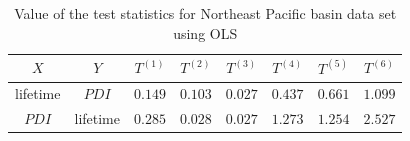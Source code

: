 \begin{table}[H]
	\centering
	\begin{tabular}{cccccccc}
	\toprule
	\toprule
	$X$   & $Y$   & $T^{(1)}$ & $T^{(2)}$ & $T^{(3)}$ & $T^{(4)}$ & $T^{(5)}$ & $T^{(6)}$ \\
	\midrule
	lifetime & $PDI$ & $0.149$ & $0.103$ & $0.027$ & $0.437$ & $0.661$ & $1.099$ \\
	$PDI$ & lifetime & $0.285$ & $0.028$ & $0.027$ & $1.273$ & $1.254$ & $2.527$ \\
	\bottomrule
	\end{tabular}
	\caption{Value of the test statistics for Northeast Pacific basin data set using OLS}
	\label{tab:base-epac-ols-statistics}
\end{table}
